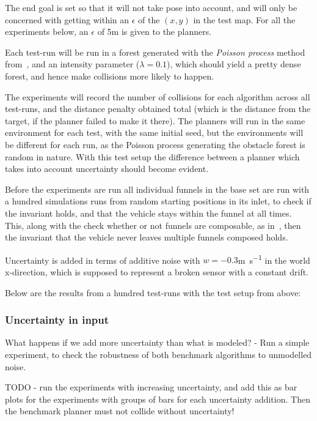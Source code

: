 The end goal is set so that it will not take pose into account, and will only be
concerned with getting within an \(\epsilon\) of the \((x,y)\) in the test map.
For all the experiments below, an \(\epsilon\) of 5\si{\metre} is given to the
planners.

Each test-run will be run in a forest generated with the \textit{Poisson
  process} method from~, and an intensity parameter
(\(\lambda = 0.1\)), which should yield a pretty dense forest, and hence make
collisions more likely to happen.

The experiments will record the number of collisions for each algorithm across
all test-runs, and the distance penalty obtained total (which is the distance
from the target, if the planner failed to make it there). The planners will run
in the same environment for each test, with the same initial seed, but the
environments will be different for each run, as the Poisson process generating
the obstacle forest is random in nature. With this test setup the difference
between a planner which takes into account uncertainty should become evident.

Before the experiments are run all individual funnels in the base set are run
with a hundred simulations runs from random starting positions in its inlet, to
check if the invariant holds, and that the vehicle stays within the funnel at
all times. This, along with the check whether or not funnels are composable, as
in~, then the invariant that the vehicle never
leaves multiple funnels composed holds.

Uncertainty is added in terms of additive noise with \(w = -0.3\)\si{m.s^{-1}}
in the world x-direction, which is supposed to represent a broken sensor with a
constant drift.

Below are the results from a hundred test-runs with the test setup from above:

\subsubsection{Uncertainty in input}

What happens if we add more uncertainty than what is modeled? - Run a simple
experiment, to check the robustness of both benchmark algorithms to unmodelled
noise.

TODO - run the experiments with increasing uncertainty, and add this as bar
plots for the experiments with groups of bars for each uncertainty addition.
Then the benchmark planner must not collide without uncertainty!

